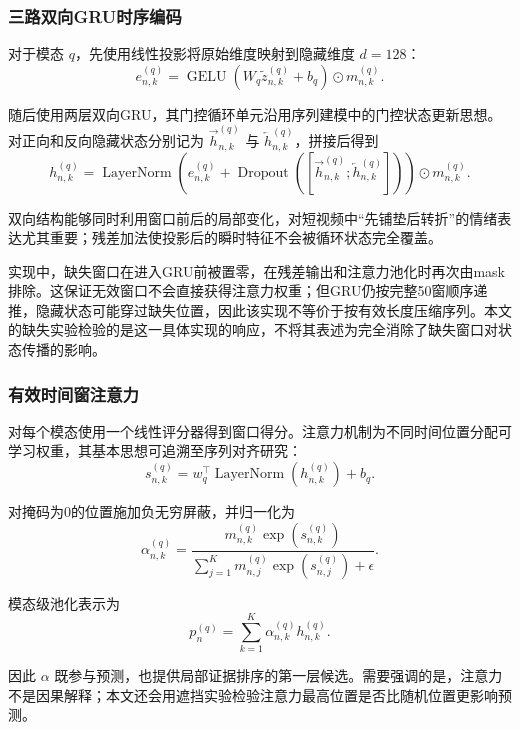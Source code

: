 \documentclass{gmcmthesis}
\begin{document}
\subsubsection{三路双向GRU时序编码}
对于模态 $q$，先使用线性投影将原始维度映射到隐藏维度 $d=128$：
\begin{equation}
e_{n,k}^{(q)}=\operatorname{GELU}(W_q\tilde z_{n,k}^{(q)}+b_q)\odot m_{n,k}^{(q)}.
\end{equation}
\par\indent 随后使用两层双向GRU，其门控循环单元沿用序列建模中的门控状态更新思想\cite{cho2014learning}。对正向和反向隐藏状态分别记为 $\overrightarrow h_{n,k}^{(q)}$ 与 $\overleftarrow h_{n,k}^{(q)}$，拼接后得到
\begin{equation}
h_{n,k}^{(q)}=\operatorname{LayerNorm}\left(e_{n,k}^{(q)}+\operatorname{Dropout}\left([\overrightarrow h_{n,k}^{(q)};\overleftarrow h_{n,k}^{(q)}]\right)\right)\odot m_{n,k}^{(q)}.
\label{eq:bigru}
\end{equation}
\par\indent 双向结构能够同时利用窗口前后的局部变化，对短视频中“先铺垫后转折”的情绪表达尤其重要；残差加法使投影后的瞬时特征不会被循环状态完全覆盖。
\par\indent 实现中，缺失窗口在进入GRU前被置零，在残差输出和注意力池化时再次由mask排除。这保证无效窗口不会直接获得注意力权重；但GRU仍按完整50窗顺序递推，隐藏状态可能穿过缺失位置，因此该实现不等价于按有效长度压缩序列。本文的缺失实验检验的是这一具体实现的响应，不将其表述为完全消除了缺失窗口对状态传播的影响。
\subsubsection{有效时间窗注意力}
对每个模态使用一个线性评分器得到窗口得分。注意力机制为不同时间位置分配可学习权重，其基本思想可追溯至序列对齐研究\cite{bahdanau2015neural}：
\begin{equation}
s_{n,k}^{(q)}=w_q^{\top}\operatorname{LayerNorm}(h_{n,k}^{(q)})+b_q.
\end{equation}
\par\indent 对掩码为0的位置施加负无穷屏蔽，并归一化为
\begin{equation}
\alpha_{n,k}^{(q)}=\frac{m_{n,k}^{(q)}\exp(s_{n,k}^{(q)})}{\sum_{j=1}^{K}m_{n,j}^{(q)}\exp(s_{n,j}^{(q)})+\epsilon}.
\end{equation}
\par\indent 模态级池化表示为
\begin{equation}
p_n^{(q)}=\sum_{k=1}^{K}\alpha_{n,k}^{(q)}h_{n,k}^{(q)}.
\label{eq:attention_pool}
\end{equation}
\par\indent 因此 $\alpha$ 既参与预测，也提供局部证据排序的第一层候选。需要强调的是，注意力不是因果解释；本文还会用遮挡实验检验注意力最高位置是否比随机位置更影响预测。
\end{document}
